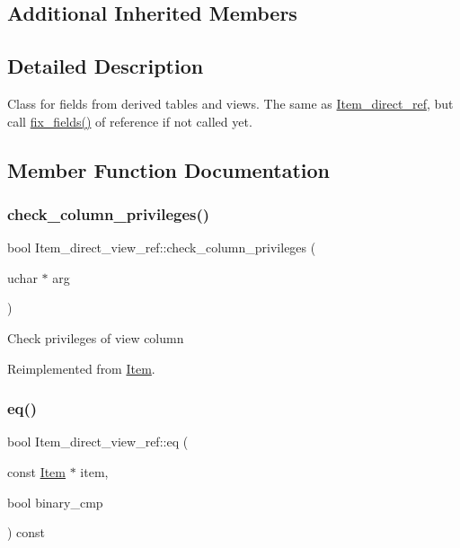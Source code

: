 \subsection*{Additional Inherited Members}


\subsection{Detailed Description}
Class for fields from derived tables and views. The same as \mbox{\hyperlink{classItem__direct__ref}{Item\+\_\+direct\+\_\+ref}}, but call \mbox{\hyperlink{classItem__direct__view__ref_acb21497e89521376904d0cfa9a8b9340}{fix\+\_\+fields()}} of reference if not called yet. 

\subsection{Member Function Documentation}
\mbox{\label{classItem__direct__view__ref_af222b3c64ab25fe5d914154f0eb73039}} 
\subsubsection{\texorpdfstring{check\+\_\+column\+\_\+privileges()}{check\_column\_privileges()}}
{\footnotesize\ttfamily bool Item\+\_\+direct\+\_\+view\+\_\+ref\+::check\+\_\+column\+\_\+privileges (\begin{DoxyParamCaption}\item[{uchar $\ast$}]{arg }\end{DoxyParamCaption})\hspace{0.3cm}{\ttfamily [virtual]}}

Check privileges of view column 

Reimplemented from \mbox{\hyperlink{classItem}{Item}}.

\mbox{\label{classItem__direct__view__ref_ae9d8bc691bf2687ea154e83f8943bdf7}} 
\subsubsection{\texorpdfstring{eq()}{eq()}}
{\footnotesize\ttfamily bool Item\+\_\+direct\+\_\+view\+\_\+ref\+::eq (\begin{DoxyParamCaption}\item[{const \mbox{\hyperlink{classItem}{Item}} $\ast$}]{item,  }\item[{bool}]{binary\+\_\+cmp }\end{DoxyParamCaption}) const\hspace{0.3cm}{\ttfamily [virtual]}}

